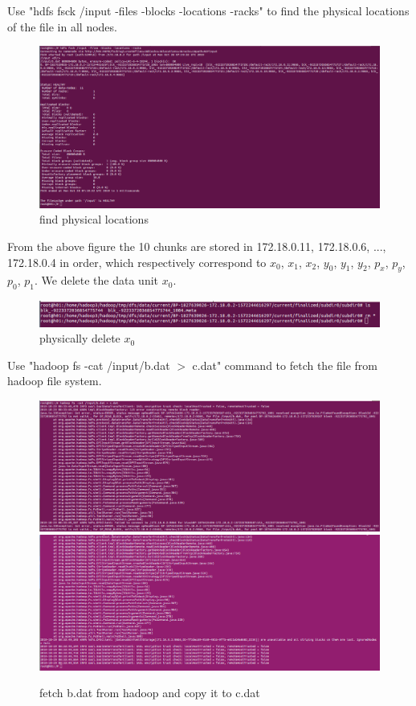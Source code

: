 \documentclass[10pt]{article}
\begin{document}
Use "hdfs fsck /input -files -blocks -locations -racks" to find the physical locations of the file in all nodes.
\begin{figure}[H]
  \centering
  \includegraphics[width=\linewidth]{test-4.png}
  \caption{find physical locations}
\end{figure}

From the above figure the 10 chunks are stored in 172.18.0.11, 172.18.0.6, ..., 172.18.0.4 in order, which 
respectively correspond to 
$x_{0}$, $x_{1}$, $x_{2}$, $y_{0}$, $y_{1}$, $y_{2}$, $p_{x}$, $p_{y}$, $p_{0}$, $p_{1}$.
We delete the data unit $x_{0}$.
\begin{figure}[H]
  \centering
  \includegraphics[width=\linewidth]{test-5.png}
  \caption{physically delete $x_{0}$}
\end{figure}

Use "hadoop fs -cat /input/b.dat $>$ c.dat" command to fetch the file from hadoop file system.

\begin{figure}[H]
  \centering
  \includegraphics[width=\linewidth]{test-6.png}
  \includegraphics[width=\linewidth]{test-7.png}
  \caption{fetch b.dat from hadoop and copy it to c.dat}
\end{figure}
\end{document}
